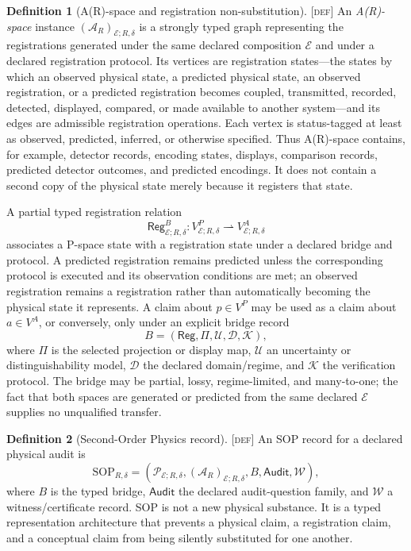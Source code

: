 \documentclass[11pt]{article}
\newcommand{\Pspace}{\ensuremath{\mathcal{P}}}
\newcommand{\ARspace}{\ensuremath{\mathcal{A}_{R}}}
\newcommand{\SOP}{\ensuremath{\mathrm{SOP}}}
\newcommand{\Reg}{\ensuremath{\mathsf{Reg}}}
\newcommand{\Audit}{\ensuremath{\mathsf{Audit}}}
\newcommand{\Defn}{\textsc{[def]}}
\theoremstyle{definition}
\newtheorem{sdefinition}{Definition}
\begin{document}
\begin{sdefinition}[A(R)-space and registration non-substitution]
\label{def:arspace}
\Defn{} An \emph{A(R)-space} instance $(\ARspace)_{\mathcal E;R,\delta}$ is a
strongly typed graph representing the registrations generated under the same
declared composition $\mathcal E$ and under a declared registration protocol. Its
vertices are registration states---the states by which an observed physical state,
a predicted physical state, an observed registration, or a predicted registration
becomes coupled, transmitted, recorded, detected, displayed, compared, or made
available to another system---and its edges are admissible registration operations.
Each vertex is status-tagged at least as observed, predicted, inferred, or
otherwise specified. Thus A(R)-space contains, for example, detector records,
encoding states, displays, comparison records, predicted detector outcomes, and
predicted encodings. It does not contain a second copy of the physical state merely
because it registers that state.

A partial typed registration relation
\begin{equation}
\Reg^{B}_{\mathcal E;R,\delta}:
V^{P}_{\mathcal E;R,\delta}\rightharpoonup
V^{A}_{\mathcal E;R,\delta}
\label{eq:paired-registration-relation}
\end{equation}
associates a P-space state with a registration state under a declared bridge and
protocol. A predicted registration remains predicted unless the corresponding
protocol is executed and its observation conditions are met; an observed
registration remains a registration rather than automatically becoming the
physical state it represents. A claim about $p\in V^P$ may be used as a claim about
$a\in V^A$, or conversely, only under an explicit bridge record
\begin{equation}
B=\left(\Reg,\Pi,\mathcal U,\mathcal D,\mathcal K\right),
\label{eq:typed-bridge-v15}
\end{equation}
where $\Pi$ is the selected projection or display map, $\mathcal U$ an uncertainty
or distinguishability model, $\mathcal D$ the declared domain/regime, and
$\mathcal K$ the verification protocol. The bridge may be partial, lossy,
regime-limited, and many-to-one; the fact that both spaces are generated or
predicted from the same declared $\mathcal E$ supplies no unqualified transfer.
\end{sdefinition}

\begin{sdefinition}[Second-Order Physics record]\label{def:sop-record-v9}
\Defn{} An SOP record for a declared physical audit is
\begin{equation}
\SOP_{R,\delta}=\left(\Pspace_{\mathcal E;R,\delta},(\ARspace)_{\mathcal E;R,\delta},B,\Audit,\mathcal W\right),
\label{eq:sop-record-v9}
\end{equation}
where $B$ is the typed bridge, $\Audit$ the declared audit-question family, and
$\mathcal W$ a witness/certificate record. SOP is not a new physical substance. It
is a typed representation architecture that prevents a physical claim, a
registration claim, and a conceptual claim from being silently substituted for
one another.
\end{sdefinition}
\end{document}

